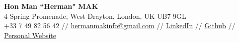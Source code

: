 \documentclass[a4paper,11pt]{article}
\begin{document}

\begin{center}
    \textbf{\Large Hon Man ``Herman" MAK} \\ \vspace{1pt}
    4 Spring Promenade, West Drayton, London, UK UB7 9GL\\
    \small +33 7 49 82 56 42 // \href{mailto:hermanmakinfo@gmail.com}{\underline{hermanmakinfo@gmail.com}} // %
    \href{https://www.linkedin.com/in/herman-hm-mak/}{\underline{LinkedIn}} // %
    \href{https://github.com/hermanmakhm}{\underline{Github}} // %
    \href{https://hermanmak.com}{\underline{Personal Website}}%
\end{center}


\end{document}
